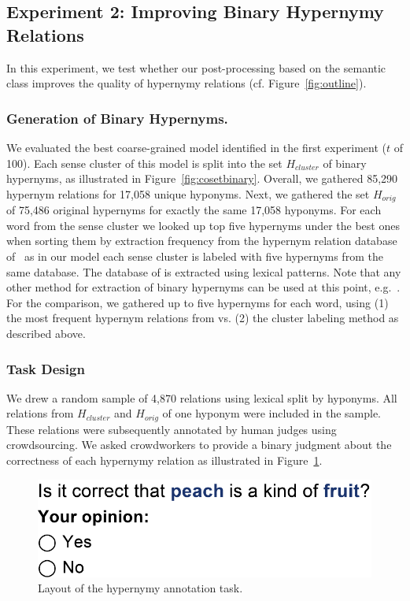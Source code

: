 \documentclass[10pt, a4paper]{article}
\begin{document}
\subsection{Experiment 2: Improving Binary Hypernymy Relations}

In this experiment, we test whether our post-processing based on the semantic class improves the quality of hypernymy relations (cf. Figure~\ref{fig:outline}).

\subsubsection{Generation of Binary Hypernyms.}
We evaluated the best coarse-grained model identified in the first experiment 
($t$ of 100). Each sense cluster of this model is split into the set $H_{cluster}$ of binary hypernyms, as illustrated in Figure~\ref{fig:cosetbinary}. Overall, we gathered 85,290 hypernym relations for 17,058 unique hyponyms. Next, we gathered the set $H_{orig}$ of 75,486 original hypernyms for exactly the same 17,058 hyponyms. For each word from the sense cluster we looked up top five hypernyms under the best ones when sorting them by extraction frequency from the hypernym relation database of~ as in our model each sense cluster is labeled with five hypernyms from the same database. The database of  is extracted  using lexical patterns. Note that any other method for extraction of binary hypernyms can be used at this point, e.g.~\cite{weeds2014learning,roller2014inclusive,shwartz-goldberg-dagan:2016:P16-1,glavavs-ponzetto:2017:EMNLP2017}. For the comparison, we gathered up to five hypernyms for each word, using (1) the most frequent hypernym relations from \cite{seitner2016large} vs. (2)  the cluster labeling method as described above. 

\subsubsection{Task Design}

We drew a random sample of 4,870 relations using lexical split by hyponyms. All relations from $H_{cluster}$ and $H_{orig}$ of one hyponym were included in the sample. These relations were subsequently annotated by human judges using crowdsourcing. We asked crowdworkers to provide a binary judgment about the correctness of each hypernymy relation as illustrated in Figure~\ref{fig:crowdhyper}.   


\begin{figure}[t]
  \centering
  \includegraphics[width=.375\textwidth]{figures/exp3-hit}
  \caption{Layout of the hypernymy annotation task.}
  \label{fig:crowdhyper}
\end{figure}
\end{document}
